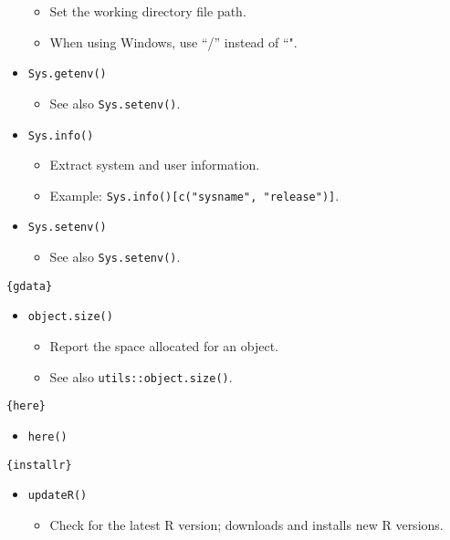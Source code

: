 \documentclass[
]{book}
\providecommand{\tightlist}{%
  \setlength{\itemsep}{0pt}\setlength{\parskip}{0pt}}
\begin{document}
\begin{itemize}
  \begin{itemize}
  \tightlist
  \item
    Set the working directory file path.
  \item
    When using Windows, use ``/'' instead of ``".
  \end{itemize}
\item
  \texttt{Sys.getenv()}

  \begin{itemize}
  \tightlist
  \item
    See also \texttt{Sys.setenv()}.
  \end{itemize}
\item
  \texttt{Sys.info()}

  \begin{itemize}
  \tightlist
  \item
    Extract system and user information.
  \item
    Example: \texttt{Sys.info(){[}c("sysname",\ "release"){]}}.
  \end{itemize}
\item
  \texttt{Sys.setenv()}

  \begin{itemize}
  \tightlist
  \item
    See also \texttt{Sys.setenv()}.
  \end{itemize}
\end{itemize}

\texttt{\{gdata\}}

\begin{itemize}
\tightlist
\item
  \texttt{object.size()}

  \begin{itemize}
  \tightlist
  \item
    Report the space allocated for an object.
  \item
    See also \texttt{utils::object.size()}.
  \end{itemize}
\end{itemize}

\texttt{\{here\}}

\begin{itemize}
\tightlist
\item
  \texttt{here()}
\end{itemize}

\texttt{\{installr\}}

\begin{itemize}
\tightlist
\item
  \texttt{updateR()}

  \begin{itemize}
  \tightlist
  \item
    Check for the latest R version; downloads and installs new R versions.
  \end{itemize}
\end{itemize}
\end{document}
